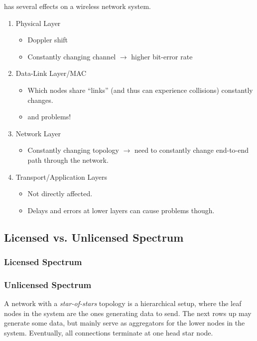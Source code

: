  has several effects on a wireless network system.
\begin{enumerate}[noitemsep]
\item Physical Layer
  \begin{itemize}[noitemsep]
  \item Doppler shift
  \item Constantly changing channel $\rightarrow$ higher bit-error rate
  \end{itemize}
\item Data-Link Layer/MAC
  \begin{itemize}[noitemsep]
  \item Which nodes share “links” (and thus can experience collisions) constantly changes.
  \item {} and  problems!
  \end{itemize}
\item Network Layer
  \begin{itemize}[noitemsep]
  \item Constantly changing topology $\rightarrow$ need to constantly change end-to-end path through the network.
  \end{itemize}
\item Transport/Application Layers
  \begin{itemize}[noitemsep]
  \item Not directly affected.
  \item Delays and errors at lower layers can cause problems though.
  \end{itemize}
\end{enumerate}

\subsection{Licensed vs. Unlicensed Spectrum}\label{subsec:Licensed_vs_Unlicensed}
\subsubsection{Licensed Spectrum}\label{subsubsec:Licensed_Spectrum}
\subsubsection{Unlicensed Spectrum}\label{subsubsec:Unlicensed_Spectrum}

\begin{definition}\label{def:Star_of_Stars}
  A network with a \emph{star-of-stars} topology is a hierarchical setup, where the leaf nodes in the system are the ones generating data to send.
  The next rows up may generate some data, but mainly serve as aggregators for the lower nodes in the system.
  Eventually, all connections terminate at one head star node.
\end{definition}

